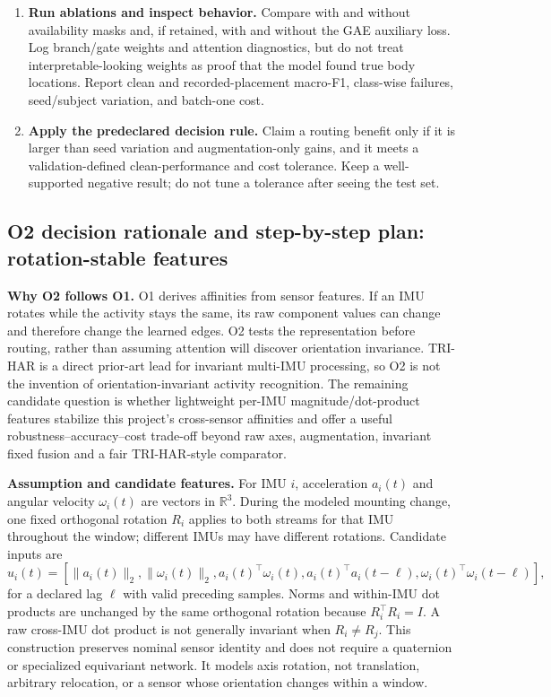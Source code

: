 \documentclass[10pt,a4paper]{article}
\begin{document}
\begin{enumerate}
\item \textbf{Run ablations and inspect behavior.} Compare with and without availability masks and, if retained, with and without the GAE auxiliary loss. Log branch/gate weights and attention diagnostics, but do not treat interpretable-looking weights as proof that the model found true body locations. Report clean and recorded-placement macro-F1, class-wise failures, seed/subject variation, and batch-one cost.
\item \textbf{Apply the predeclared decision rule.} Claim a routing benefit only if it is larger than seed variation and augmentation-only gains, and it meets a validation-defined clean-performance and cost tolerance. Keep a well-supported negative result; do not tune a tolerance after seeing the test set.
\end{enumerate}

\subsection{O2 decision rationale and step-by-step plan: rotation-stable features}
\textbf{Why O2 follows O1.} O1 derives affinities from sensor features. If an IMU rotates while the activity stays the same, its raw component values can change and therefore change the learned edges. O2 tests the representation before routing, rather than assuming attention will discover orientation invariance. TRI-HAR is a direct prior-art lead for invariant multi-IMU processing, so O2 is not the invention of orientation-invariant activity recognition. The remaining candidate question is whether lightweight per-IMU magnitude/dot-product features stabilize this project's cross-sensor affinities and offer a useful robustness--accuracy--cost trade-off beyond raw axes, augmentation, invariant fixed fusion and a fair TRI-HAR-style comparator.

\textbf{Assumption and candidate features.} For IMU $i$, acceleration $a_i(t)$ and angular velocity $\omega_i(t)$ are vectors in $\mathbb R^3$. During the modeled mounting change, one fixed orthogonal rotation $R_i$ applies to both streams for that IMU throughout the window; different IMUs may have different rotations. Candidate inputs are
\[
u_i(t)=\left[\|a_i(t)\|_2,\|\omega_i(t)\|_2,
a_i(t)^\top\omega_i(t),
a_i(t)^\top a_i(t-\ell),
\omega_i(t)^\top\omega_i(t-\ell)\right],
\]
for a declared lag $\ell$ with valid preceding samples. Norms and within-IMU dot products are unchanged by the same orthogonal rotation because $R_i^\top R_i=I$. A raw cross-IMU dot product is not generally invariant when $R_i\ne R_j$. This construction preserves nominal sensor identity and does not require a quaternion or specialized equivariant network. It models axis rotation, not translation, arbitrary relocation, or a sensor whose orientation changes within a window.
\end{document}
